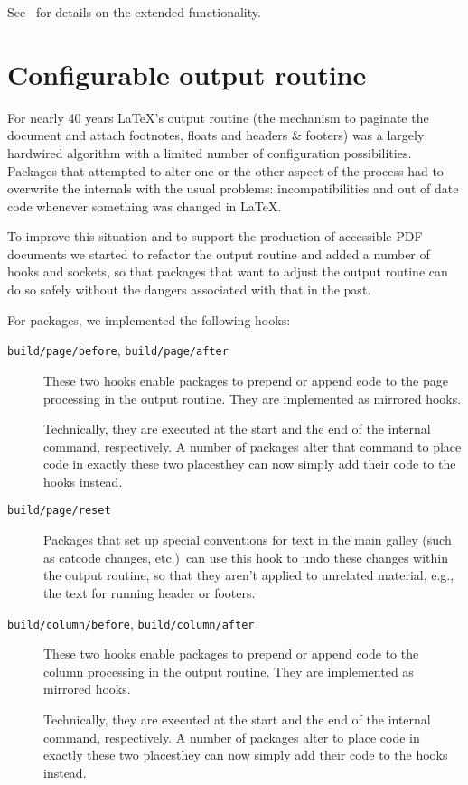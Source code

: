 \documentclass{ltnews}
\providecommand\Dash {\unskip \textemdash}
\providecommand\hook[1]{\texttt{#1}}
\begin{document}
See~\cite{41:ltmarks} for details on the extended functionality.


\section{Configurable output routine}

For nearly 40 years \LaTeX's output routine (the mechanism to paginate
the document and attach footnotes, floats and headers \& footers) was
a largely hardwired algorithm with a limited number of configuration
possibilities.  Packages that attempted to alter one or the other
aspect of the process had to overwrite the internals with the usual
problems: incompatibilities and out of date code whenever something
was changed in \LaTeX{}.

To improve this situation and to support the production of accessible
PDF documents we started to refactor the output routine and added a
number of hooks and sockets, so that packages that want to adjust the
output routine can do so safely without the dangers associated with
that in the past.

For packages, we implemented the following hooks:
\begin{description}
\item[\hook{build/page/before}, \hook{build/page/after}]
   These two hooks enable packages to prepend or append code to
   the page processing in the output routine. They are
   implemented as mirrored hooks.

   Technically, they are executed at the start and the end of the
   internal \LaTeXe{}  command, respectively.  A
   number of packages alter that command to place code in exactly
   these two places\Dash they can now simply add their code to the
   hooks instead.

\item[\hook{build/page/reset}]
   Packages that set up special conventions for text in the main
   galley (such as catcode changes, etc.)\ can use this hook to
   undo these changes within the output routine, so that they
   aren't applied to unrelated material, e.g., the text for
   running header or footers.

\item[\hook{build/column/before}, \hook{build/column/after}]
   These two hooks enable packages to prepend or append code to
   the column processing in the output routine. They are
   implemented as mirrored hooks.

   Technically, they are executed at the start and the end of the
   internal \LaTeXe{}  command, respectively.  A
   number of packages alter  to place code in exactly
   these two places\Dash they can now simply add their code to the
   hooks instead.
\end{description}
\end{document}
